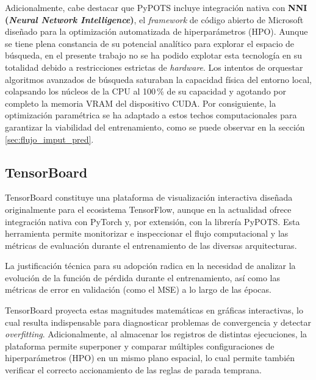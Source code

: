 Adicionalmente, cabe destacar que PyPOTS incluye integración nativa con \textbf{NNI (\textit{Neural Network Intelligence})}, el \textit{framework} de código abierto de Microsoft diseñado para la optimización automatizada de hiperparámetros (HPO). Aunque se tiene plena constancia de su potencial analítico para explorar el espacio de búsqueda, en el presente trabajo no se ha podido explotar esta tecnología en su totalidad debido a restricciones estrictas de \textit{hardware}. Los intentos de orquestar algoritmos avanzados de búsqueda saturaban la capacidad física del entorno local, colapsando los núcleos de la CPU al 100\,\% de su capacidad y agotando por completo la memoria VRAM del dispositivo CUDA. Por consiguiente, la optimización paramétrica se ha adaptado a estos techos computacionales para garantizar la viabilidad del entrenamiento, como se puede observar en la sección \ref{sec:flujo_imput_pred}. %


\subsection{TensorBoard}
\label{subsec:tensorboard}

TensorBoard constituye una plataforma de visualización interactiva diseñada originalmente para el ecosistema TensorFlow, aunque en la actualidad ofrece integración nativa con PyTorch y, por extensión, con la librería PyPOTS. Esta herramienta permite monitorizar e inspeccionar el flujo computacional y las métricas de evaluación durante el entrenamiento de las diversas arquitecturas.

La justificación técnica para su adopción radica en la necesidad de analizar la evolución de la función de pérdida durante el entrenamiento, así como las métricas de error en validación (como el MSE) a lo largo de las épocas. 

TensorBoard proyecta estas magnitudes matemáticas en gráficas interactivas, lo cual resulta indispensable para diagnosticar problemas de convergencia y detectar \textit{overfitting}. Adicionalmente, al almacenar los registros de distintas ejecuciones, la plataforma permite superponer y comparar múltiples configuraciones de hiperparámetros (HPO) en un mismo plano espacial, lo cual permite también verificar el correcto accionamiento de las reglas de parada temprana.





